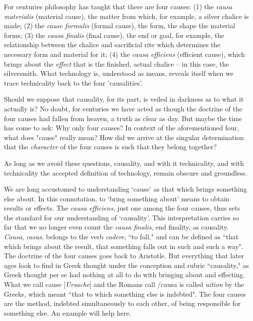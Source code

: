 \documentclass[12pt]{article}
\begin{document}
For centuries philosophy has taught that there are four causes: (1) the \textit{causa materialis} (material cause), the matter from which, for example, a silver chalice is made; (2) the \textit{cause formalis} (formal cause), the form, the shape the material forms; (3) the \textit{causa finalis} (final cause), the end or goal, for example, the relationship between the chalice and sacrificial rite which determines the necessary form and material for it; (4) the \textit{causa efficiens} (efficient cause), which brings about the \textit{effect} that is the finished, actual chalice -- in this case, the silversmith. What technology is, understood as means, reveals itself when we trace technicality back to the four 'causalities'.

Should we suppose that causality, for its part, is veiled in darkness as to what it actually is? No doubt, for centuries we have acted as though the doctrine of the four causes had fallen from heaven, a truth as clear as day. But maybe the time has come to ask: Why only four causes? In context of the aforementioned four, what does "cause" really mean? How did we arrive at the singular determination that the \textit{character} of the four causes is such that they belong together?

As long as we avoid these questions, causality, and with it technicality, and with technicality the accepted definition of technology, remain obscure and groundless.

We are long accustomed to understanding `cause' as that which brings something else about. In this connotation, to `bring something about' means to obtain results or effects. The \textit{causa efficiens}, just one among the four causes, thus sets the standard for our understanding of `causality'. This interpretation carries so far that we no longer even count the \textit{causa finalis}, end finality, as causality. \textit{Causa}, \textit{casus}, belongs to the verb \textit{cadere}, ``to fall," and can be defined as ``that which brings about the result, that something falls out in such and such a way". The doctrine of the four causes goes back to Aristotle. But everything that later ages look to find in Greek thought under the conception and rubric ``causality," as Greek thought per se had nothing at all to do with bringing about and effecting. What we call cause [\textit{Ursache}] and the Romans call /{causa} is called \textit{aition} by the Greeks, which meant ``that to which something else is indebted". The four causes are the method, indebted simultaneously to each other, of being responsible for something else. An example will help here.
\end{document}
